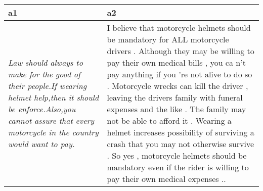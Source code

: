 \centering
\caption{
              Student explanations from \textbf{TMPI} in an Ethics MOOC, 
              for the question prompt: ``Assuming that motorcycle drivers are 
              willing to pay their own medical bills, should they be allowed to 
              ride without a helmet?''. 
              }
\begin{tabular}{p{6cm}|p{6cm}}
\toprule
                                                                                
               a1 
&                                                                               
                                     a2
 \\
\midrule
\textit{ Law should always to make for the good of their people.If wearing 
helmet help,then it should be enforce.Also,you cannot assure that every 
motorcycle in the country would want to  pay. } &  I believe that motorcycle 
helmets should be mandatory for ALL motorcycle drivers . Although they may be 
willing to pay their own medical bills , you ca n't pay anything if you 're not 
alive to do so . Motorcycle wrecks can kill the driver , leaving the drivers 
family with funeral expenses and the like . The family may not be able to 
afford it . Wearing a helmet increases possibility of surviving a crash that 
you may not otherwise survive . So yes , motorcycle helmets should be mandatory 
even if the rider is willing to pay their own medical expenses .. \\
\bottomrule
\end{tabular}
